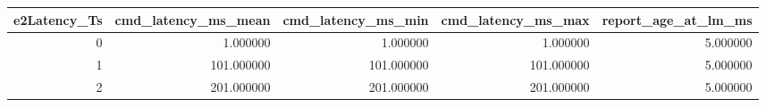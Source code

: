 \begin{tabular}{rrrrr}
\toprule
e2Latency_Ts & cmd_latency_ms_mean & cmd_latency_ms_min & cmd_latency_ms_max & report_age_at_lm_ms \\
\midrule
0 & 1.000000 & 1.000000 & 1.000000 & 5.000000 \\
1 & 101.000000 & 101.000000 & 101.000000 & 5.000000 \\
2 & 201.000000 & 201.000000 & 201.000000 & 5.000000 \\
\bottomrule
\end{tabular}
